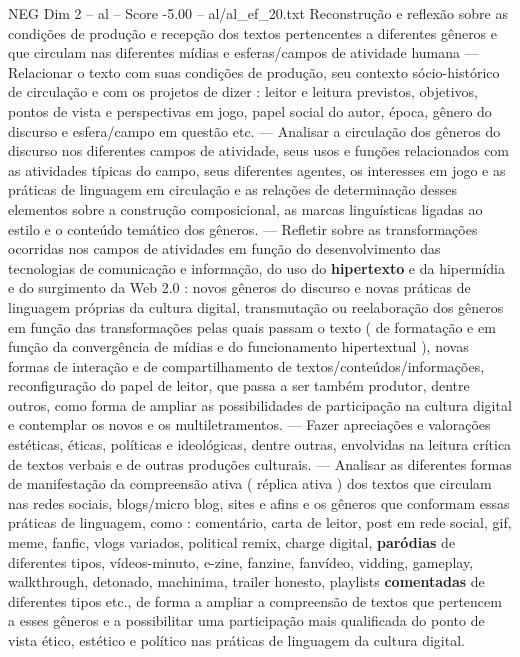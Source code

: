 \begin{textsample}{NEG Dim 2 – al – Score -5.00 – al/al\_ef\_20.txt}  \label{ex:f2_neg_023}
Reconstrução e reflexão sobre as condições de produção e recepção dos textos pertencentes a diferentes gêneros e que circulam nas diferentes mídias e esferas/campos de atividade humana — Relacionar o texto com suas condições de produção, seu contexto sócio-histórico de circulação e com os projetos de dizer : leitor e leitura previstos, objetivos, pontos de vista e perspectivas em jogo, papel social do autor, época, gênero do discurso e esfera/campo em questão etc. — Analisar a circulação dos gêneros do discurso nos diferentes campos de atividade, seus usos e funções relacionados com as atividades típicas do campo, seus diferentes agentes, os interesses em jogo e as práticas de linguagem em circulação e as relações de determinação desses elementos sobre a construção composicional, as marcas linguísticas ligadas ao estilo e o conteúdo temático dos gêneros. — Refletir sobre as transformações ocorridas nos campos de atividades em função do desenvolvimento das tecnologias de comunicação e informação, do uso do \textbf{hipertexto} e da hipermídia e do surgimento da Web 2.0 : novos gêneros do discurso e novas práticas de linguagem próprias da cultura digital, transmutação ou reelaboração dos gêneros em função das transformações pelas quais passam o texto ( de formatação e em função da convergência de mídias e do funcionamento hipertextual ), novas formas de interação e de compartilhamento de textos/conteúdos/informações, reconfiguração do papel de leitor, que passa a ser também produtor, dentre outros, como forma de ampliar as possibilidades de participação na cultura digital e contemplar os novos e os multiletramentos. — Fazer apreciações e valorações estéticas, éticas, políticas e ideológicas, dentre outras, envolvidas na leitura crítica de textos verbais e de outras produções culturais. — Analisar as diferentes formas de manifestação da compreensão ativa ( réplica ativa ) dos textos que circulam nas redes sociais, blogs/micro blog, sites e afins e os gêneros que conformam essas práticas de linguagem, como : comentário, carta de leitor, post em rede social, gif, meme, fanfic, vlogs variados, political remix, charge digital, \textbf{paródias} de diferentes tipos, vídeos-minuto, e-zine, fanzine, fanvídeo, vidding, gameplay, walkthrough, detonado, machinima, trailer honesto, playlists \textbf{comentadas} de diferentes tipos etc., de forma a ampliar a compreensão de textos que pertencem a esses gêneros e a possibilitar uma participação mais qualificada do ponto de vista ético, estético e político nas práticas de linguagem da cultura digital.

\end{textsample}
